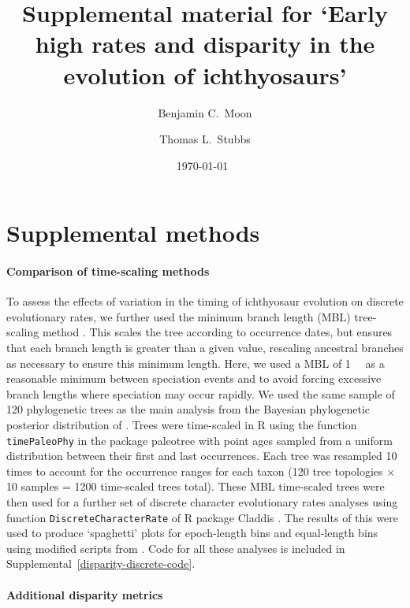 \documentclass[british,a4paper]{article}
\title{Supplemental material for `Early high rates and disparity in the
evolution of ichthyosaurs'}
\author{Benjamin C.\ Moon \and Thomas L.\ Stubbs}
\date{\today~\version}
\begin{document}
\maketitle

\tableofcontents

\section{Supplemental methods}\label{supplemental-methods}

\paragraph{Comparison of time-scaling methods}\label{comparison-of-time-scaling-methods}

To assess the effects of variation in the timing of ichthyosaur evolution on
discrete evolutionary rates, we further used the minimum branch length (MBL)
tree-scaling method \autocite{Bapst2012MEE, Laurin2004SB}. This scales the
tree according to occurrence dates, but ensures that each branch length is
greater than a given value, rescaling ancestral branches as necessary to ensure
this minimum length. Here, we used a MBL of \SI{1}{\mega\annum} as a reasonable
minimum between speciation events and to avoid forcing excessive branch lengths
where speciation may occur rapidly. We used the same sample of 120 phylogenetic
trees as the main analysis from the Bayesian phylogenetic posterior distribution
of \textcite{Moon2018JSP}. Trees were time-scaled in R \autocite{RCoreTeam2019} using the
function \texttt{timePaleoPhy} in the package paleotree \autocite{Bapst2012MEE}
with point ages sampled from a uniform distribution between their first and last
occurrences. Each tree was resampled 10 times to account for the occurrence
ranges for each taxon (120 tree topologies × 10 samples = 1200 time-scaled trees
total). These MBL time-scaled trees were then used for a further set of discrete
character evolutionary rates analyses using function
\texttt{DiscreteCharacterRate} of R package Claddis \autocite{Lloyd2016BJLS}. The
results of this were used to produce `spaghetti' plots for epoch-length bins and
equal-length bins using modified scripts from \textcite{Close2015CB}. Code for
all these analyses is included in Supplemental~\ref{disparity-discrete-code}.

\paragraph{Additional disparity metrics}
\end{document}
